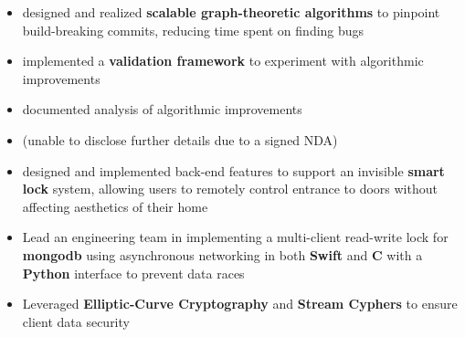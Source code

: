 \documentclass[10pt,a4paper,ragged2e]{altacv}
\begin{document}

\begin{fullwidth}
    \makecvheader
\end{fullwidth}




\begin{itemize}
    \item designed and realized \textbf{scalable graph-theoretic algorithms} to pinpoint build-breaking commits,
        reducing time spent on finding bugs
    \item implemented a \textbf{validation framework} to experiment with algorithmic improvements
    \item documented analysis of algorithmic improvements
    \item (unable to disclose further details due to a signed NDA)
\end{itemize}

\divider

\begin{itemize}
    \item designed and implemented back-end features to support an invisible \textbf{smart lock} system,
        allowing users to remotely control entrance to doors without affecting aesthetics of their home
    \item Lead an engineering team in implementing a multi-client read-write lock for \textbf{mongodb} using asynchronous networking in both \textbf{Swift} and \textbf{C} with a \textbf{Python} interface to prevent data races
    \item Leveraged \textbf{Elliptic-Curve Cryptography} and \textbf{Stream Cyphers} to ensure client data security
\end{itemize}
\end{document}
